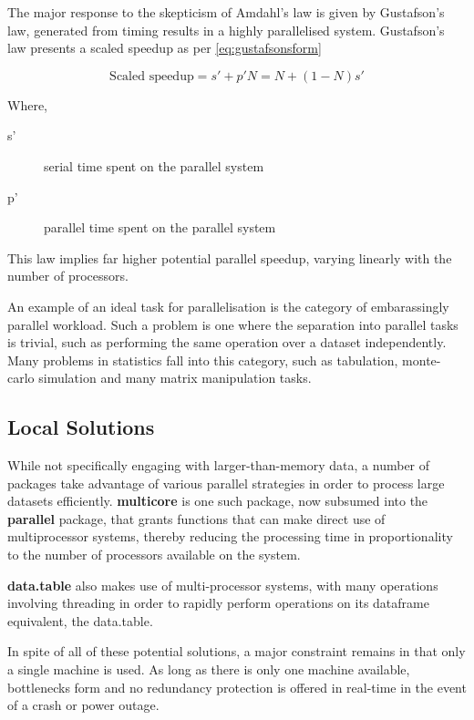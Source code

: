 The major response to the skepticism of Amdahl's law is given by
Gustafson's law, generated from timing results in a highly parallelised
system. Gustafson's law presents a scaled speedup as per
\ref{eq:gustafsonsform}

\begin{equation}\label{eq:gustafsonsform}
	\textrm{Scaled speedup} = s' + p'N = N + (1-N)s'
\end{equation}

Where,

\begin{description}
	\item[s'] serial time spent on the parallel system
	\item[p'] parallel time spent on the parallel system
\end{description}

This law implies far higher potential parallel speedup, varying linearly
with the number of processors.

An example of an ideal task for parallelisation is the category of
embarassingly parallel workload. Such a problem is one where the
separation into parallel tasks is trivial, such as performing the same
operation over a dataset independently\cite{foster1995parallel}. Many
problems in statistics fall into this category, such as tabulation,
monte-carlo simulation and many matrix manipulation tasks.

\hypertarget{sec:local}{%
	\subsection{Local Solutions}\label{sec:local}}

While not specifically engaging with larger-than-memory data, a number
of packages take advantage of various parallel strategies in order to
process large datasets efficiently. \textbf{multicore} is one such
package, now subsumed into the \textbf{parallel} package, that grants
functions that can make direct use of multiprocessor systems, thereby
reducing the processing time in proportionality to the number of
processors available on the system.

\textbf{data.table} also makes use of multi-processor systems, with many
operations involving threading in order to rapidly perform operations on
its dataframe equivalent, the data.table.

In spite of all of these potential solutions, a major constraint remains
in that only a single machine is used. As long as there is only one
machine available, bottlenecks form and no redundancy protection is
offered in real-time in the event of a crash or power outage.

